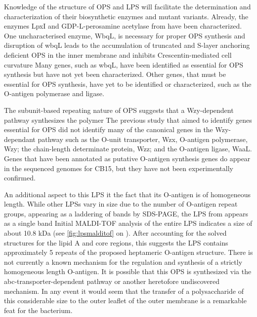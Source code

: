         Knowledge of the structure of \caulobacter{} \ac{OPS} and \ac{LPS} will facilitate the determination
        and characterization of their biosynthetic enzymes and mutant variants. Already, the enzymes
        LpxI and GDP-L-perosamine acetylase from
        \caulobacter have been characterized. One uncharacterised enzyme, WbqL, is necessary for proper
        \ac{OPS} synthesis and disruption of wbqL leads to the accumulation of truncated and S-layer
        anchoring deficient \ac{OPS} in the inner membrane and inhibits Crescentin-mediated cell
        curvature Many genes, such as wbqL, have been identified as
        essential for \ac{OPS} synthesis but have not yet been characterized. Other
        genes, that must be essential for \ac{OPS} synthesis, have yet to be identified or characterized,
        such as the O-antigen polymerase and ligase.


        The subunit-based repeating nature of \caulobacter{} \ac{OPS} suggests that a Wzy-dependent pathway
        synthesizes the polymer The previous study that aimed to identify genes
        essential for \ac{OPS} did not identify many of the canonical genes in the Wzy-dependant
        pathway such as the O-unit transporter, Wzx, O-antigen polymerase, Wzy; the
        chain-length determinate protein, Wzz; and the O-antigen ligase, WaaL. Genes that have been
        annotated as putative O-antigen synthesis genes do appear in the sequenced genomes for \caulobacter
        CB15, but they have not been experimentally confirmed.

        An additional aspect to this \ac{LPS} it the fact that its O-antigen is of homogeneous length. While
        other \ac{LPS}s vary in size due to the number of O-antigen repeat groups, appearing as a laddering
        of bands by \ac{SDS-PAGE}, the \ac{LPS} from \caulobacter appears as a single
        band Initial \ac{MALDI-TOF} analysis of the entire \ac{LPS} indicates a size of
        about 10.8 kDa (see \cref{fig:lpsmalditof} on ).  After accounting for the
        solved structures for the lipid A and core regions, this suggests the \ac{LPS} contains
        approximately 5 repeats of the proposed heptameric O-antigen structure.  There is not currently a
        known mechanism for the regulation and synthesis of a strictly homogeneous length O-antigen. It is
        possible that this \ac{OPS} is synthesized via the \ac{abc}-transporter-dependent
        pathway or another heretofore undiscovered mechanism. In any event it would seem
        that the transfer of a polysaccharide of this considerable size to the outer leaflet of the outer
        membrane is a remarkable feat for the bacterium.
